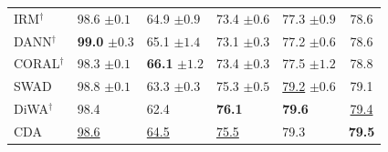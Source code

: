 \documentclass[10pt]{article}
\begin{document}
\begin{table}[H]
\begin{tabular}{lllll|c}
IRM$^\dagger$ & 98.6 \scriptsize$\pm0.1$ & 64.9 \scriptsize$\pm0.9$ & 73.4 \scriptsize$\pm0.6$ & 77.3 \scriptsize$\pm0.9$ & 78.6 \\
DANN$^\dagger$ & \textbf{99.0} \scriptsize$\pm0.3$ & 65.1 \scriptsize$\pm1.4$ & 73.1 \scriptsize$\pm0.3$ & 77.2 \scriptsize$\pm0.6$ & 78.6 \\
CORAL$^\dagger$ & 98.3 \scriptsize$\pm0.1$ & \textbf{66.1} \scriptsize$\pm1.2$ & 73.4 \scriptsize$\pm0.3$ & 77.5 \scriptsize$\pm1.2$ & 78.8 \\
SWAD & 98.8 \scriptsize$\pm0.1$ & 63.3 \scriptsize$\pm0.3$ & 75.3 \scriptsize$\pm0.5$ & \underline{79.2} \scriptsize$\pm0.6$ & 79.1 \\
DiWA$^\dagger$ & 98.4 & 62.4 & \textbf{76.1} & \textbf{79.6} & \underline{79.4} \\
\midrule
CDA & \underline{98.6} & \underline{64.5} & \underline{75.5} & 79.3 & \textbf{79.5} \\
\bottomrule
\end{tabular}
\end{table}
\end{document}
